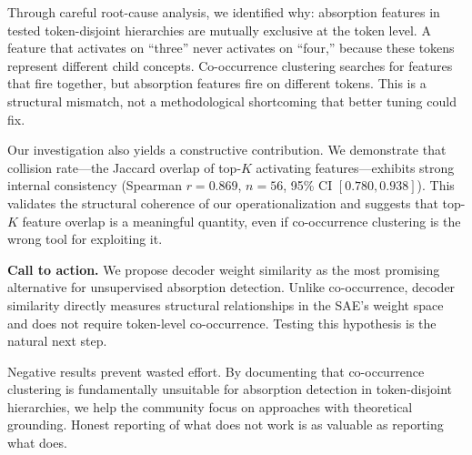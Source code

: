 \documentclass{article}
\begin{document}
Through careful root-cause analysis, we identified why: absorption features in tested token-disjoint hierarchies are mutually exclusive at the token level. A feature that activates on ``three'' never activates on ``four,'' because these tokens represent different child concepts. Co-occurrence clustering searches for features that fire together, but absorption features fire on different tokens. This is a structural mismatch, not a methodological shortcoming that better tuning could fix.

Our investigation also yields a constructive contribution. We demonstrate that collision rate---the Jaccard overlap of top-$K$ activating features---exhibits strong internal consistency (Spearman $r = 0.869$, $n = 56$, 95\% CI $[0.780, 0.938]$). This validates the structural coherence of our operationalization and suggests that top-$K$ feature overlap is a meaningful quantity, even if co-occurrence clustering is the wrong tool for exploiting it.

\textbf{Call to action.} We propose decoder weight similarity as the most promising alternative for unsupervised absorption detection. Unlike co-occurrence, decoder similarity directly measures structural relationships in the SAE's weight space and does not require token-level co-occurrence. Testing this hypothesis is the natural next step.

Negative results prevent wasted effort. By documenting that co-occurrence clustering is fundamentally unsuitable for absorption detection in token-disjoint hierarchies, we help the community focus on approaches with theoretical grounding. Honest reporting of what does not work is as valuable as reporting what does.



\end{document}
